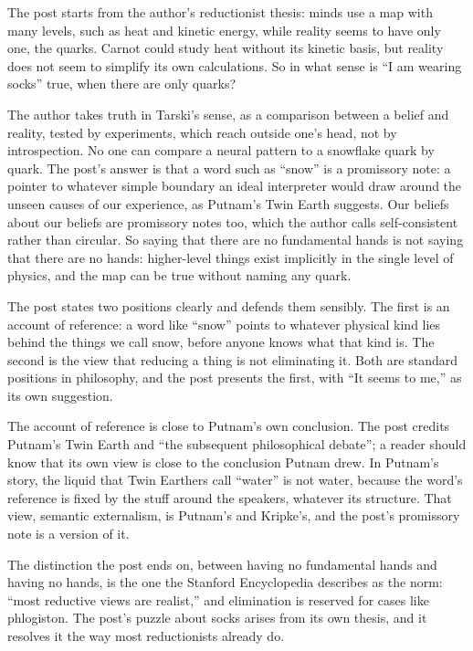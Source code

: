 \begin{afterword}
\summaryhead

The post starts from the author's reductionist thesis: minds use a map with many levels, such as heat and kinetic energy, while reality seems to have only one, the quarks. Carnot could study heat without its kinetic basis, but reality does not seem to simplify its own calculations. So in what sense is ``I am wearing socks'' true, when there are only quarks?

The author takes truth in Tarski's sense, as a comparison between a belief and reality, tested by experiments, which reach outside one's head, not by introspection. No one can compare a neural pattern to a snowflake quark by quark. The post's answer is that a word such as ``snow'' is a promissory note: a pointer to whatever simple boundary an ideal interpreter would draw around the unseen causes of our experience, as Putnam's Twin Earth suggests. Our beliefs about our beliefs are promissory notes too, which the author calls self-consistent rather than circular. So saying that there are no fundamental hands is not saying that there are no hands: higher-level things exist implicitly in the single level of physics, and the map can be true without naming any quark.

\responsehead

The post states two positions clearly and defends them sensibly. The first is an account of reference: a word like ``snow'' points to whatever physical kind lies behind the things we call snow, before anyone knows what that kind is. The second is the view that reducing a thing is not eliminating it. Both are standard positions in philosophy, and the post presents the first, with ``It seems to me,'' as its own suggestion.

The account of reference is close to Putnam's own conclusion. The post credits Putnam's Twin Earth and ``the subsequent philosophical debate''; a reader should know that its own view is close to the conclusion Putnam drew. In Putnam's story, the liquid that Twin Earthers call ``water'' is not water, because the word's reference is fixed by the stuff around the speakers, whatever its structure. That view, semantic externalism, is Putnam's and Kripke's, and the post's promissory note is a version of it.

The distinction the post ends on, between having no fundamental hands and having no hands, is the one the Stanford Encyclopedia describes as the norm: ``most reductive views are realist,'' and elimination is reserved for cases like phlogiston. The post's puzzle about socks arises from its own thesis, and it resolves it the way most reductionists already do.


\end{afterword}
